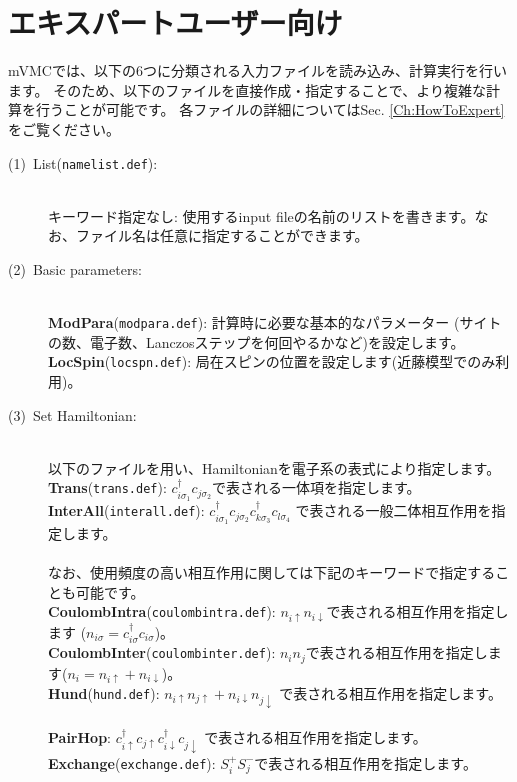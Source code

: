 \section{エキスパートユーザー向け}
mVMCでは、以下の6つに分類される入力ファイルを読み込み、計算実行を行います。
そのため、以下のファイルを直接作成・指定することで、より複雑な計算を行うことが可能です。
各ファイルの詳細についてはSec. \ref{Ch:HowToExpert}をご覧ください。
\\
\begin{description}
\item[(1)~List(\texttt{namelist.def}):]
~\\{キーワード指定なし}:
使用するinput fileの名前のリストを書きます。なお、ファイル名は任意に指定することができます。
\item[(2)~Basic parameters:]
  ~\\{\bf ModPara}(\verb|modpara.def|): 計算時に必要な基本的なパラメーター
  (サイトの数、電子数、Lanczosステップを何回やるかなど)を設定します。
  ~\\{\bf LocSpin}(\verb|locspn.def|): 局在スピンの位置を設定します(近藤模型でのみ利用)。
\item[(3)~Set Hamiltonian:] 
  ~\\以下のファイルを用い、Hamiltonianを電子系の表式により指定します。
  ~\\{\bf Trans}(\verb|trans.def|):
  $c_{i\sigma_1}^{\dag}c_{j\sigma_2}$で表される一体項を指定します。
  ~\\{\bf InterAll}(\verb|interall.def|):
  $c_ {i \sigma_1}^{\dag}c_{j\sigma_2}c_{k \sigma_3}^{\dag}c_{l \sigma_4}$
  で表される一般二体相互作用を指定します。\\
  ~\\なお、使用頻度の高い相互作用に関しては下記のキーワードで指定することも可能です。
  ~\\{\bf CoulombIntra}(\verb|coulombintra.def|):
  $n_ {i \uparrow}n_{i \downarrow}$で表される相互作用を指定します
  ($n_{i \sigma}=c_{i\sigma}^{\dag}c_{i\sigma}$)。
  ~\\{\bf CoulombInter}(\verb|coulombinter.def|):
  $n_ {i}n_{j}$で表される相互作用を指定します($n_i=n_{i\uparrow}+n_{i\downarrow}$)。
  ~\\{\bf Hund}(\verb|hund.def|): $n_{i\uparrow}n_{j\uparrow}+n_{i\downarrow}n_{j\downarrow}$
  で表される相互作用を指定します。
  ~\\{\bf PairHop}:  $c_ {i \uparrow}^{\dag}c_{j\uparrow}c_{i \downarrow}^{\dag}c_{j  \downarrow}$
  で表される相互作用を指定します。
  ~\\{\bf Exchange}(\verb|exchange.def|): $S_i^+ S_j^-$で表される相互作用を指定します。

\end{description}
